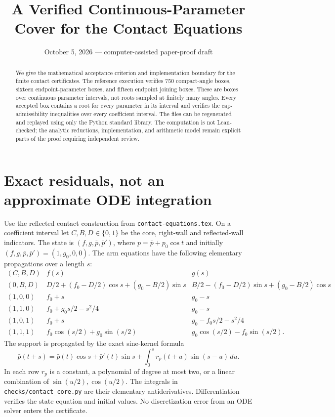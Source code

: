 \documentclass[11pt]{article}
\title{A Verified Continuous-Parameter Cover for the Contact Equations}
\author{}\date{October 5, 2026 --- computer-assisted paper-proof draft}
\begin{document}
\maketitle
\begin{abstract}
We give the mathematical acceptance criterion and implementation boundary for the finite contact certificates. The reference execution verifies 750 compact-angle boxes, sixteen endpoint-parameter boxes, and fifteen endpoint joining boxes. These are boxes over continuous parameter intervals, not roots sampled at finitely many angles. Every accepted box contains a root for every parameter in its interval and verifies the cap-admissibility inequalities over every coefficient interval. The files can be regenerated and replayed using only the Python standard library. The computation is not Lean-checked; the analytic reductions, implementation, and arithmetic model remain explicit parts of the proof requiring independent review.
\end{abstract}

\section{Exact residuals, not an approximate ODE integration}
Use the reflected contact construction from \texttt{contact-equations.tex}. On a coefficient interval let $C,B,D\in\{0,1\}$ be the core, right-wall and reflected-wall indicators. The state is $(f,g,\bar p,\bar p')$, where $p=\bar p+p_0\cos t$ and initially $(f,g,\bar p,\bar p')=(1,g_0,0,0)$. The arm equations have the following elementary propagations over a length $s$:
\[
\begin{array}{c|c|c}
(C,B,D)&f(s)&g(s)\\\hline
(0,B,D)&D/2+(f_0-D/2)\cos s+(g_0-B/2)\sin s
&B/2-(f_0-D/2)\sin s+(g_0-B/2)\cos s\\
(1,0,0)&f_0+s&g_0-s\\
(1,1,0)&f_0+g_0s/2-s^2/4&g_0-s\\
(1,0,1)&f_0+s&g_0-f_0s/2-s^2/4\\
(1,1,1)&f_0\cos(s/2)+g_0\sin(s/2)&g_0\cos(s/2)-f_0\sin(s/2).
\end{array}
\]
The support is propagated by the exact sine-kernel formula
\[
 \bar p(t+s)=\bar p(t)\cos s+\bar p'(t)\sin s
            +\int_0^s r_p(t+u)\sin(s-u)\,du.
\]
In each row $r_p$ is a constant, a polynomial of degree at most two, or a linear combination of $\sin(u/2),\cos(u/2)$. The integrals in \texttt{checks/contact\_core.py} are their elementary antiderivatives. Differentiation verifies the state equation and initial values. No discretization error from an ODE solver enters the certificate.
\end{document}
